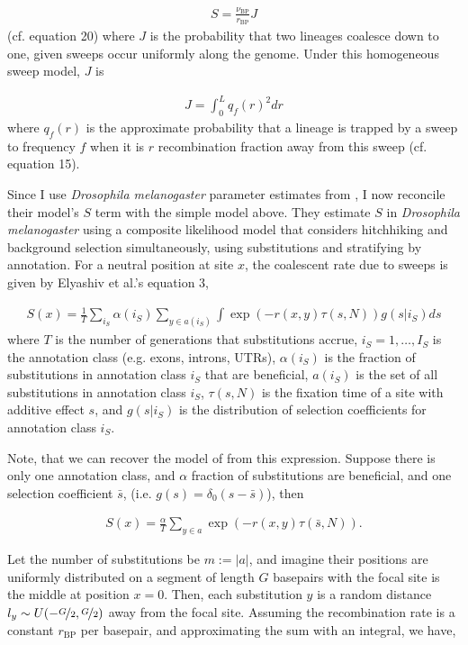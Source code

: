 \documentclass[11pt]{article}
\begin{document}
\begin{align}
  S = \frac{\nu_\text{BP}}{r_\text{BP}} J
\end{align}
%
(cf. \cite{Coop2012-cd} equation 20) where $J$ is the probability that two
lineages coalesce down to one, given sweeps occur uniformly along the genome.
Under this homogeneous sweep model, $J$ is 

\begin{align}
  J = \int_0^L q_f(r)^2 dr 
\end{align}
%
where $q_f(r)$ is the approximate probability that a lineage is trapped by a
sweep to frequency $f$ when it is $r$ recombination fraction away from this
sweep (cf. \cite{Coop2012-cd} equation 15). 

Since I use \emph{Drosophila melanogaster} parameter estimates from
\textcite{Elyashiv2016-vt}, I now reconcile their model's $S$ term with the
simple model above. They estimate $S$ in \emph{Drosophila melanogaster} using a
composite likelihood model that considers hitchhiking and background selection
simultaneously, using substitutions and stratifying by annotation.  For a
neutral position at site $x$, the coalescent rate due to sweeps is given by
Elyashiv et al.'s equation 3, 

\begin{align}
  S(x) = \frac{1}{T} \sum_{i_S} \alpha(i_S) \sum_{y \in a(i_S)} \int \exp(-r(x, y) \tau(s, N)) g(s | i_S) ds
\end{align}
%
where $T$ is the number of generations that substitutions accrue, $i_S = 1,
\ldots, I_S$ is the annotation class (e.g. exons, introns, UTRs), $\alpha(i_S)$
is the fraction of substitutions in annotation class $i_S$ that are beneficial,
$a(i_S)$ is the set of all substitutions in annotation class $i_S$, $\tau(s,
N)$ is the fixation time of a site with additive effect $s$, and $g(s | i_S)$
is the distribution of selection coefficients for annotation class $i_S$. 

Note, that we can recover the model of \textcite{Coop2012-cd} from this
expression. Suppose there is only one annotation class, and $\alpha$ fraction
of substitutions are beneficial, and one selection coefficient $\bar{s}$, (i.e.
$g(s) = \delta_0(s - \bar{s})$), then

\begin{align}
  S(x) = \frac{\alpha}{T} \sum_{y \in {a}} \exp(-r(x,y)\tau(\bar{s}, N)).
\end{align}
%

Let the number of substitutions be $m := |a|$, and imagine their positions are
uniformly distributed on a segment of length $G$ basepairs with the focal site
is the middle at position $x=0$. Then, each substitution $y$ is a random
distance $l_y \sim U(-\nicefrac{G}{2}, \nicefrac{G}{2})$ away from the focal
site. Assuming the recombination rate is a constant $r_\text{BP}$ per
basepair, and approximating the sum with an integral, we have,
\end{document}
